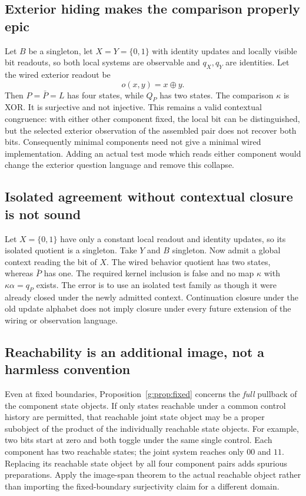 \documentclass[11pt]{article}
\theoremstyle{definition}
\theoremstyle{remark}\newtheorem{remark}[theorem]{Remark}
\begin{document}
\subsection{Exterior hiding makes the comparison properly epic}
Let $B$ be a singleton, let $X=Y=\{0,1\}$ with identity updates and
locally visible bit readouts, so both local systems are observable and
$q_X,q_Y$ are identities. Let the wired exterior readout be
\[
 o(x,y)=x\mathbin{\oplus}y.
\]
Then $P=\bar P=L$ has four states, while $Q_P$ has two states. The
comparison $\kappa$ is XOR. It is surjective and not injective. This
remains a valid contextual congruence: with either other component fixed,
the local bit can be distinguished, but the selected exterior observation
of the assembled pair does not recover both bits. Consequently minimal
components need not give a minimal wired implementation. Adding an
actual test mode which reads either component would change the exterior
question language and remove this collapse.

\subsection{Isolated agreement without contextual closure is not sound}
Let $X=\{0,1\}$ have only a constant local readout and identity updates,
so its isolated quotient is a singleton. Take $Y$ and $B$ singleton.
Now admit a global context reading the bit of $X$. The wired behavior
quotient has two states, whereas $\bar P$ has one. The required kernel
inclusion is false and no map $\kappa$ with $\kappa\alpha=q_P$ exists.
The error is to use an isolated test family as though it were already
closed under the newly admitted context. Continuation closure under the
old update alphabet does not imply closure under every future extension
of the wiring or observation language.

\subsection{Reachability is an additional image, not a harmless convention}
Even at fixed boundaries, Proposition~\ref{g:prop:fixed} concerns the
\emph{full} pullback of the component state objects. If only states
reachable under a common control history are permitted, that reachable
joint state object may be a proper subobject of the product of the
individually reachable state objects. For example, two bits start at
zero and both toggle under the same single control. Each component has
two reachable states; the joint system reaches only $00$ and $11$.
Replacing its reachable state object by all four component pairs adds
spurious preparations. Apply the image-span theorem to the actual
reachable object rather than importing the fixed-boundary surjectivity
claim for a different domain.
\end{document}
